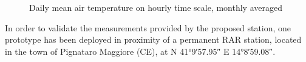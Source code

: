 \documentclass[authoryear,preprint,review,12pt]{elsarticle}
\begin{document}
\begin{figure}
    \centering
    \hspace{5mm}
    \caption{Daily mean air temperature on hourly time scale, monthly averaged}
    \label{fig:hourly}
\end{figure}

In order to validate the measurements provided by the proposed station, one prototype has been deployed in proximity of a permanent RAR station, located in the town of Pignataro Maggiore (CE), at N \ang{41;9;57.95} E \ang{14;8;59.08}.
\end{document}
